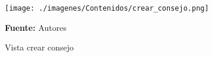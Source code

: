 \begin{figure}[!htb]
  \begin{center}
\texttt{[image: ./imagenes/Contenidos/crear\_consejo.png]}
    \caption{Vista crear consejo}
    \label{fig:Vista_crear_consejo}
    \textbf{Fuente:}  Autores
  \end{center}
\end{figure}
